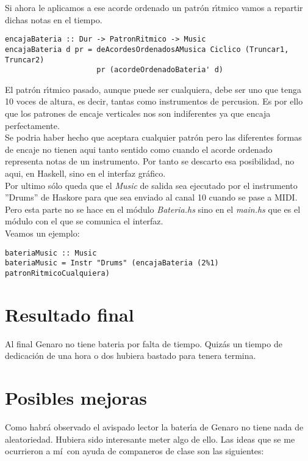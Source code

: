\documentclass[a4paper]{report}
\begin{document}
Si ahora le aplicamos a ese acorde ordenado un patr\'on r\'\i tmico vamos a repartir
dichas notas en el tiempo.

\small
\begin{verbatim}
encajaBateria :: Dur -> PatronRitmico -> Music
encajaBateria d pr = deAcordesOrdenadosAMusica Ciclico (Truncar1, Truncar2) 
                     pr (acordeOrdenadoBateria' d)
\end{verbatim}
\normalsize

\indent El patr\'on r\'\i tmico pasado, aunque puede ser cualquiera, debe ser uno que tenga 
10 voces de altura, es decir, tantas como instrumentos de percusion. Es por
ello que los patrones de encaje verticales nos son indiferentes ya que encaja
perfectamente.\\
\indent Se podria haber hecho que aceptara cualquier patr\'on pero las diferentes formas
de encaje no tienen aqui tanto sentido como cuando el acorde ordenado representa
notas de un instrumento. Por tanto se descarto esa posibilidad, no aqui, en Haskell,
sino en el interfaz gr\'afico.\\
\indent Por ultimo s\'olo queda que el \emph{Music} de salida sea ejecutado por el instrumento
''Drums'' de Haskore para que sea enviado al canal 10 cuando se pase a MIDI.
Pero esta parte no se hace en el m\'odulo \emph{Bateria.hs} sino en el \emph{main.hs} que es
el m\'odulo con el que se comunica el interfaz.\\
\indent Veamos un ejemplo:

\small
\begin{verbatim}
bateriaMusic :: Music
bateriaMusic = Instr "Drums" (encajaBateria (2%1) patronRitmicoCualquiera)
\end{verbatim}
\normalsize

\section{Resultado final}
Al final Genaro no tiene bateria por falta de tiempo. Quiz\'as un tiempo
de dedicaci\'on de una hora o dos hubiera bastado para tenera termina.

\section{Posibles mejoras}
Como habr\'a observado el avispado lector la bater\'\i a de Genaro no tiene
nada de aleatoriedad. Hubiera sido interesante meter algo de ello. Las ideas
que se me ocurrieron a m\'i~con ayuda de companeros de clase son las siguientes:
\end{document}

